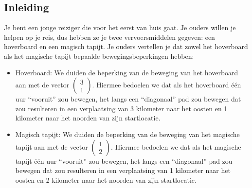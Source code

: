 \documentclass{ximera}
\begin{document}
\author{Alexander Holvoet}

\subsection*{Inleiding}
Je bent een jonge reiziger die voor het eerst van huis gaat.
Je ouders willen je helpen op je reis, dus hebben ze je twee vervoersmiddelen gegeven: een hoverboard en een magisch tapijt.
Je ouders vertellen je dat zowel het hoverboard als het magische tapijt bepaalde bewegingsbeperkingen hebben:
\begin{itemize}
    \item Hoverboard: We duiden de beperking van de beweging van het hoverboard aan met de vector $\begin{pmatrix} 3\\ 1\end{pmatrix}$.
    Hiermee bedoelen we dat als het hoverboard één uur ``vooruit'' zou bewegen, het langs een ``diagonaal'' pad zou bewegen dat zou resulteren in een verplaatsing van 3 kilometer naar het oosten en 1 kilometer naar het noorden van zijn startlocatie.
    \item Magisch tapijt: We duiden de beperking van de beweging van het magische tapijt aan met de vector $\begin{pmatrix} 1 \\ 2 \end{pmatrix}$.
    Hiermee bedoelen we dat als het magische tapijt één uur ``vooruit'' zou bewegen, het langs een ``diagonaal'' pad zou bewegen dat zou resulteren in een verplaatsing van 1 kilometer naar het oosten en 2 kilometer naar het noorden van zijn startlocatie.
\end{itemize}
\end{document}
